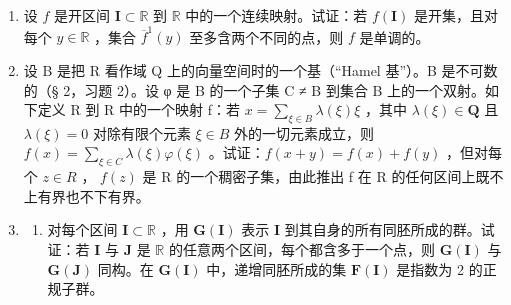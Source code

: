 \BourbakiExerciseGroup

\begin{enumerate}
\def\labelenumi{\arabic{enumi})}
\item
设 \(f\) 是开区间 \(\mathbf{I} \subset \mathbb{R}\) 到 \(\mathbb{R}\) 中的一个连续映射。试证：若 \(f(\mathbf{I})\) 是开集，且对每个 \(y \in \mathbb{R}\) ，集合 \(\overline{f}^1(y)\) 至多含两个不同的点，则 \(f\) 是单调的。
\item
设 B 是把 R 看作域 Q 上的向量空间时的一个基（``Hamel 基''）。B 是不可数的（§ 2，习题 2）。设 φ 是 B 的一个子集 C ≠ B 到集合 B 上的一个双射。如下定义 R 到 R 中的一个映射 f：若 \(x = \sum_{\xi \in B} \lambda(\xi) \xi\) ，其中 \(\lambda(\xi) \in \mathbf{Q}\) 且 \(\lambda(\xi) = 0\) 对除有限个元素 \(\xi \in B\) 外的一切元素成立，则 \(f(x) = \sum_{\xi \in C} \lambda(\xi) \varphi(\xi)\) 。试证：\(f(x + y) = f(x) + f(y)\) ，但对每个 \(z \in R\) ， \(f(z)\) 是 R 的一个稠密子集，由此推出 f 在 R 的任何区间上既不上有界也不下有界。
\item
  \begin{enumerate}
  \def\labelenumii{\alph{enumii})}
  \tightlist
  \item
对每个区间 \(\mathbf{I} \subset \mathbb{R}\) ，用 \(\mathbf{G}(\mathbf{I})\) 表示 \(\mathbf{I}\) 到其自身的所有同胚所成的群。试证：若 \(\mathbf{I}\) 与 \(\mathbf{J}\) 是 \(\mathbb{R}\) 的任意两个区间，每个都含多于一个点，则 \(\mathbf{G}(\mathbf{I})\) 与 \(\mathbf{G}(\mathbf{J})\) 同构。在 \(\mathbf{G}(\mathbf{I})\) 中，递增同胚所成的集 \(\mathbf{F}(\mathbf{I})\) 是指数为 2 的正规子群。
  \end{enumerate}
\end{enumerate}

